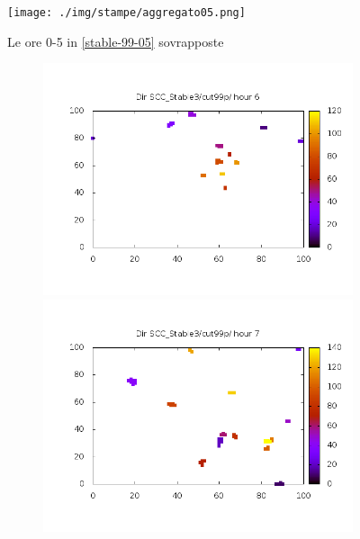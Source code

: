 \documentclass[10pt,a4paper]{article}
\begin{document}
\begin{figure}
\texttt{[image: ./img/stampe/aggregato05.png]}
\caption{Le ore 0-5 in \ref{stable-99-05} sovrapposte}
\label{stableagg0599}
\end{figure}
\begin{figure}
\begin{subfigure}[b]{1\textwidth}
\includegraphics[scale=.4]{./img/SCC_Stable3/cut99p/6.png}
\includegraphics[scale=.4]{./img/SCC_Stable3/cut99p/7.png}
\end{subfigure}
\begin{subfigure}[b]{1\textwidth}

\end{subfigure}
\end{figure}
\end{document}
